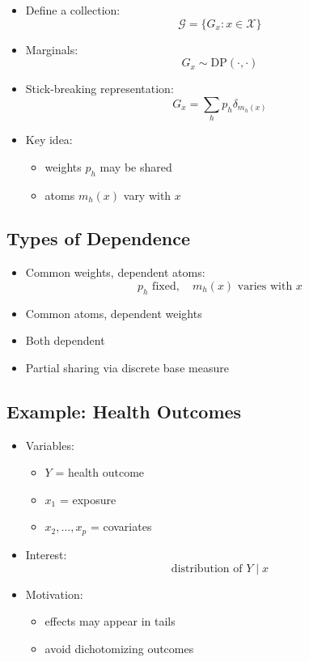 \documentclass[12pt,oneside]{book}
\numberwithin{equation}{section}
\theoremstyle{definition}
\theoremstyle{plain}
\theoremstyle{remark}
\begin{document}
\begin{itemize}
\item Define a collection:
\[
\mathcal{G} = \{G_x : x \in \mathcal{X}\}
\]

\item Marginals:
\[
G_x \sim \text{DP}(\cdot,\cdot)
\]

\item Stick-breaking representation:
\[
G_x = \sum_h p_h \delta_{m_h(x)}
\]

\item Key idea:
\begin{itemize}
\item weights $p_h$ may be shared
\item atoms $m_h(x)$ vary with $x$
\end{itemize}
\end{itemize}

\subsection*{Types of Dependence}

\begin{itemize}
\item Common weights, dependent atoms:
\[
p_h \text{ fixed}, \quad m_h(x) \text{ varies with } x
\]

\item Common atoms, dependent weights

\item Both dependent

\item Partial sharing via discrete base measure
\end{itemize}

\subsection*{Example: Health Outcomes}

\begin{itemize}
\item Variables:
\begin{itemize}
\item $Y$ = health outcome
\item $x_1$ = exposure
\item $x_2,\dots,x_p$ = covariates
\end{itemize}

\item Interest:
\[
\text{distribution of } Y \mid x
\]

\item Motivation:
\begin{itemize}
\item effects may appear in tails
\item avoid dichotomizing outcomes
\end{itemize}
\end{itemize}
\end{document}
